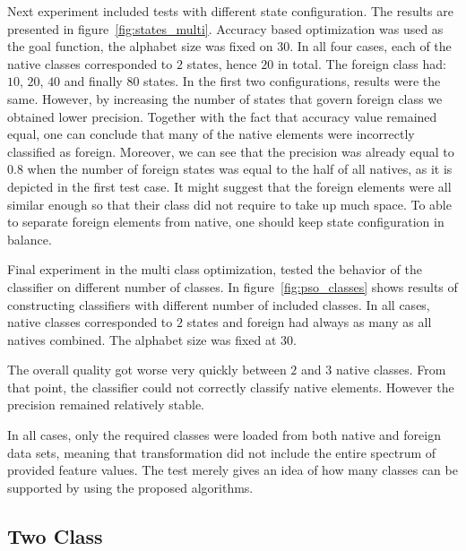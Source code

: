 \documentclass{mini}
\begin{document}
Next experiment included tests with different state configuration. The results are presented in figure~\ref{fig:states_multi}. Accuracy based optimization was used as the goal function, the alphabet size was fixed on $30$. In all four cases, each of the native classes corresponded to $2$ states, hence $20$ in total. The foreign class had: $10$, $20$, $40$ and finally $80$ states. In the first two configurations, results were the same. However, by increasing the number of states that govern foreign class we obtained lower precision. Together with the fact that accuracy value remained equal, one can conclude that many of the native elements were incorrectly classified as foreign. Moreover, we can see that the precision was already equal to $0.8$ when the number of foreign states was equal to the half of all natives, as it is depicted in the first test case. It might suggest that the foreign elements were all similar enough so that their class did not require to take up much space. To able to separate foreign elements from native, one should keep state configuration in balance.

\makeFigureFitnessMulti

\makeFigureStateConfigurationMulti

\makeFigurePSOClasses

Final experiment in the multi class optimization, tested the behavior of the classifier on different number of classes. In figure~\ref{fig:pso_classes} shows results of constructing classifiers with different number of included classes. In all cases, native classes corresponded to $2$ states and foreign had always as many as all natives combined. The alphabet size was fixed at $30$.

The overall quality got worse very quickly between $2$ and $3$ native classes. From that point, the classifier could not correctly classify native elements. However the precision remained relatively stable.

In all cases, only the required classes were loaded from both native and foreign data sets, meaning that transformation did not include the entire spectrum of provided feature values. The test merely gives an idea of how many classes can be supported by using the proposed algorithms.



\subsection{Two Class} \label{subsec:pso_two_class}
\end{document}
